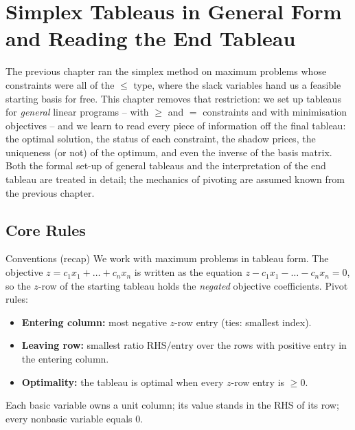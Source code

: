 \chapter{Simplex Tableaus in General Form and Reading the End Tableau}

The previous chapter ran the simplex method on maximum problems whose
constraints were all of the $\le$ type, where the slack variables hand us a
feasible starting basis for free. This chapter removes that restriction: we
set up tableaus for \emph{general} linear programs -- with $\ge$ and $=$
constraints and with minimisation objectives -- and we learn to read every
piece of information off the final tableau: the optimal solution, the status of
each constraint, the shadow prices, the uniqueness (or not) of the optimum,
and even the inverse of the basis matrix. Both the formal set-up of general
tableaus and the interpretation of
the end tableau are treated in detail; the mechanics of pivoting are assumed
known from the previous chapter.

\section{Core Rules}

\begin{rulebox}{Conventions (recap)}
We work with maximum problems in tableau form. The objective
$z=c_{1}x_{1}+\dots+c_{n}x_{n}$ is written as the equation
$z-c_{1}x_{1}-\dots-c_{n}x_{n}=0$, so the $z$-row of the starting tableau
holds the \emph{negated} objective coefficients. Pivot rules:
\begin{itemize}[leftmargin=1.6em,itemsep=0.3ex]
  \item \textbf{Entering column:} most negative $z$-row entry
        (ties: smallest index).
  \item \textbf{Leaving row:} smallest ratio $\text{RHS}/\text{entry}$ over
        the rows with positive entry in the entering column.
  \item \textbf{Optimality:} the tableau is optimal when every $z$-row entry
        is $\ge 0$.
\end{itemize}
Each basic variable owns a unit column; its value stands in the RHS of its
row; every nonbasic variable equals $0$.
\end{rulebox}

